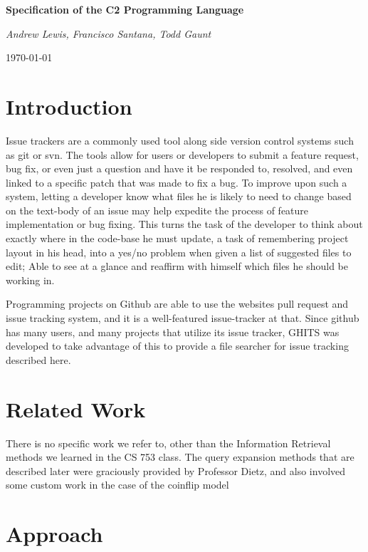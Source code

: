 \documentclass[10pt,a4paper]{article}
\begin{document}
\begin{center}
  {\huge\bfseries Specification of the C2 Programming Language\par}
  \vspace{1cm}
  {\Large\itshape Andrew Lewis, Francisco Santana, Todd Gaunt\par}
  \vspace{0.5cm}
  {\large\today\par}
\end{center}

\section{Introduction}

Issue trackers are a commonly used tool along side version control systems such
as git or svn. The tools allow for users or developers to submit a feature
request, bug fix, or even just a question and have it be responded to, resolved,
and even linked to a specific patch that was made to fix a bug. To improve upon
such a system, letting a developer know what files he is likely to need to change
based on the text-body of an issue may help expedite the process of feature
implementation or bug fixing. This turns the task of the developer to think about
exactly where in the code-base he must update, a task of remembering project
layout in his head, into a yes/no problem when given a list of suggested files
to edit; Able to see at a glance and reaffirm with himself which files he should
be working in.

Programming projects on Github are able to use the websites pull request and
issue tracking system, and it is a well-featured issue-tracker at that. Since
github has many users, and many projects that utilize its issue tracker, GHITS
was developed to take advantage of this to provide a file searcher for
issue tracking described here.

\section{Related Work}

There is no specific work we refer to, other than the Information Retrieval methods we learned in the CS 753 class. The query expansion methods that are described later were graciously provided by Professor Dietz, and also involved some custom work in the case of the coinflip model

\section{Approach}
\end{document}
